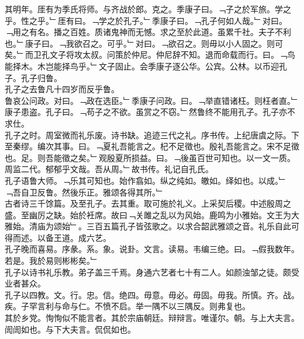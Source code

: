 \documentclass{zhvt-classic}
\begin{document}
\hspace*{2em}其明年。厓有为季氏将师。与齐战於郎。克之。季康子曰。﹁子之於军旅。学之乎。性之乎。﹂厓有曰。﹁学之於孔子。﹂季康子曰。﹁孔子何如人哉。﹂对曰。﹁用之有名。播之百姓。质诸鬼神而无憾。求之至於此道。虽累千社。夫子不利也。﹂康子曰。﹁我欲召之。可乎。﹂对曰。﹁欲召之。则毋以小人固之。则可矣。﹂而卫孔文子将攻太叔。问策於仲尼。仲尼辞不知。退而命载而行。曰。﹁鸟能择木。木岂能择鸟乎。﹂文子固止。会季康子逐公华。公宾。公林。以币迎孔子。孔子归鲁。\\
\hspace*{2em}孔子之去鲁凡十四岁而反乎鲁。\\
\hspace*{2em}鲁哀公问政。对曰。﹁政在选臣。﹂季康子问政。曰。﹁举直错诸枉。则枉者直。﹂康子患盗。孔子曰。﹁苟子之不欲。虽赏之不窃。﹂然鲁终不能用孔子。孔子亦不求仕。\\
\hspace*{2em}孔子之时。周室微而礼乐废。诗书缺。追迹三代之礼。序书传。上纪唐虞之际。下至秦缪。编次其事。曰。﹁夏礼吾能言之。杞不足徵也。殷礼吾能言之。宋不足徵也。足。则吾能徵之矣。﹂观殷夏所损益。曰。﹁後虽百世可知也。以一文一质。周监二代。郁郁乎文哉。吾从周。﹂故书传。礼记自孔氏。\\
\hspace*{2em}孔子语鲁大师。﹁乐其可知也。始作翕如。纵之纯如。皦如。绎如也。以成。﹂﹁吾自卫反鲁。然後乐正。雅颂各得其所。﹂\\
\hspace*{2em}古者诗三千馀篇。及至孔子。去其重。取可施於礼义。上采契后稷。中述殷周之盛。至幽厉之缺。始於衽席。故曰﹁关雎之乱以为风始。鹿鸣为小雅始。文王为大雅始。清庙为颂始﹂。三百五篇孔子皆弦歌之。以求合韶武雅颂之音。礼乐自此可得而述。以备王道。成六艺。\\
\hspace*{2em}孔子晚而喜易。序彖。系。象。说卦。文言。读易。韦编三绝。曰。﹁假我数年。若是。我於易则彬彬矣。﹂\\
\hspace*{2em}孔子以诗书礼乐教。弟子盖三千焉。身通六艺者七十有二人。如颜浊邹之徒。颇受业者甚众。\\
\hspace*{2em}孔子以四教。文。行。忠。信。绝四。毋意。毋必。毋固。毋我。所慎。齐。战。疾。子罕言利与命与仁。不愤不启。举一隅不以三隅反。则弗复也。\\
\hspace*{2em}其於乡党。恂恂似不能言者。其於宗庙朝廷。辩辩言。唯谨尔。朝。与上大夫言。訚訚如也。与下大夫言。侃侃如也。\\
\end{document}
